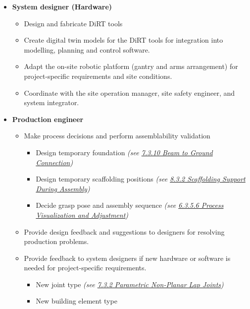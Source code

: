 \documentclass[11pt]{book}
\begin{document}
\begin{itemize}
\begin{itemize}
\end{itemize}
	\item \textbf{System designer (Hardware)}

\begin{itemize}
	\item Design and fabricate DiRT tools

	\item Create digital twin models for the DiRT tools for integration into modelling, planning and control software. 

	\item Adapt the on-site robotic platform (gantry and arms arrangement) for project-specific requirements and site conditions. 

	\item Coordinate with the site operation manager, site safety engineer, and system integrator.

\end{itemize}
	\item \textbf{Production engineer}

\begin{itemize}
	\item Make process decisions and perform assemblability validation

\begin{itemize}
	\item Design temporary foundation \textit{(see \uline{7.3.10 Beam to Ground Connection})}

	\item Design temporary scaffolding positions \textit{(see \uline{8.3.2 Scaffolding Support During Assembly})}

	\item Decide grasp pose and assembly sequence \textit{(see \uline{6.3.5.6 Process Visualization and Adjustment})}

\end{itemize}
	\item Provide design feedback and suggestions to designers for resolving production problems.

	\item Provide feedback to system designers if new hardware or software is needed for project-specific requirements.

\begin{itemize}
	\item New joint type \textit{(see \uline{7.3.2 Parametric Non-Planar Lap Joints})}

	\item New building element type


\end{itemize}
\end{itemize}
\end{itemize}
\end{document}
